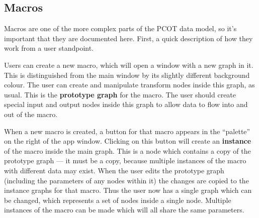 \subsection{Macros}
\label{macros}
Macros are one of the more complex parts of the PCOT data model, so it's
important that they are documented here. First, a quick description
of how they work from a user standpoint.

Users can create a new macro, which will open a window with a new graph in it.
This is distinguished from the main window by its slightly different
background colour. The user can create and manipulate transform nodes inside
this graph, as usual. This is the \textbf{prototype graph} for the macro.
The user should create special input and output nodes inside this graph
to allow data to flow into and out of the macro.

When a new macro is created, a button for that macro appears in the ``palette''
on the right of the app window. Clicking on this button will create
an \textbf{instance} of the macro inside the main graph. This is a
node which contains a copy of the prototype graph --- it must be a copy,
because multiple instances of the macro with different data may exist.
When the user edits the prototype graph (including the parameters of 
any nodes within it) the changes are copied to the instance graphs for
that macro. Thus the user now has a single graph which can be changed,
which represents a set of nodes inside a single node. Multiple instances
of the macro can be made which will all share the same parameters.

